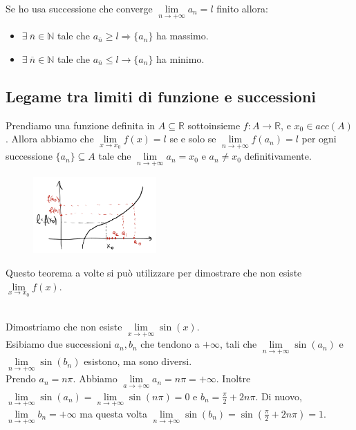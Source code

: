 \begin{theorem}
Se ho usa successione che converge $\lim\limits_{n\to +\infty}a_n = l$ finito allora:
\begin{itemize}
    \item $\exists \: \overline{n}\in \mathbb{N}$ tale che $a_{\overline{n}} \geq l \Longrightarrow \{a_n\}$ ha massimo.
    \item $\exists \: \overline{n}\in \mathbb{N}$ tale che $a_{\overline{n}} \leq l \longrightarrow \{a_n\}$ ha minimo.
\end{itemize}
\end{theorem}

\subsection{Legame tra limiti di funzione e successioni}
\begin{theorem}
Prendiamo una funzione definita in $A \subseteq \mathbb{R}$ sottoinsieme $f:A \to \mathbb{R}$, e $x_0 \in acc(A)$. Allora abbiamo che $\lim\limits_{x\to x_0}f(x) = l$ se e solo se $\lim\limits_{n\to +\infty}f(a_n) = l$ per ogni successione $\{a_n\}\subseteq A$ tale che $\lim\limits_{n\to +\infty}a_n = x_0$ e $a_n \neq x_0$ definitivamente.
\end{theorem}
\begin{figure}
    \vspace{-35pt}
    \centering
    \includegraphics[width=4.7cm]{images/legame-lim-successioni-funzioni.png}
\end{figure}
Questo teorema a volte si può utilizzare per dimostrare che non esiste $\lim\limits_{x\to x_0}f(x)$.\\\\
\begin{example}
Dimostriamo che non esiste $\lim\limits_{x\to +\infty}\sin(x)$.\\
Esibiamo due successioni $a_n, b_n$ che tendono a $+\infty$,  tali che $\lim\limits_{n\to +\infty}\sin(a_n)$ e $\lim\limits_{n\to +\infty}\sin(b_n)$ esistono, ma sono diversi.\\
Prendo $a_n = n\pi$. Abbiamo $\lim\limits_{a\to +\infty}a_n = n\pi = +\infty$. Inoltre $\lim\limits_{n\to +\infty}\sin(a_n)= \lim\limits_{n\to +\infty}\sin(n\pi) = 0$ e $b_n = \frac{\pi}{2} + 2n\pi$. Di nuovo, $\lim\limits_{n\to +\infty}b_n = +\infty$ ma questa volta $\lim\limits_{n\to +\infty}\sin(b_n) = \sin(\frac{\pi}{2} + 2n\pi) = 1$.
\end{example}
